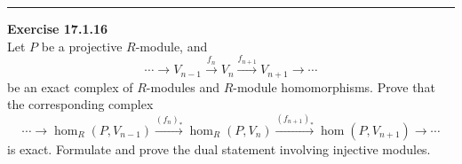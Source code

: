 \documentclass[a4paper, 12pt]{article}
\newenvironment{problem}[2][Exercise]
    { \begin{mdframed}[backgroundcolor=gray!20] \textbf{#1 #2} \\}
    {  \end{mdframed}}
\begin{document}
\noindent\rule{7in}{2.8pt}
\begin{problem}{17.1.16}
Let \(P\) be a projective \(R\)-module, and 
\[\cdots\rightarrow V_{n-1}\xrightarrow{f_n}V_n\xrightarrow{f_{n+1}}V_{n+1}\rightarrow \cdots \]
be an exact complex of \(R\)-modules and \(R\)-module homomorphisms. Prove that the corresponding complex 
\[\cdots\rightarrow\hom_R(P,V_{n-1})\xrightarrow{(f_n)_*}\hom_R(P,V_n)\xrightarrow{(f_{n+1})_*}\hom(P,V_{n+1})\rightarrow\cdots\]
is exact. Formulate and prove the dual statement involving injective modules.
\end{problem}
\end{document}
